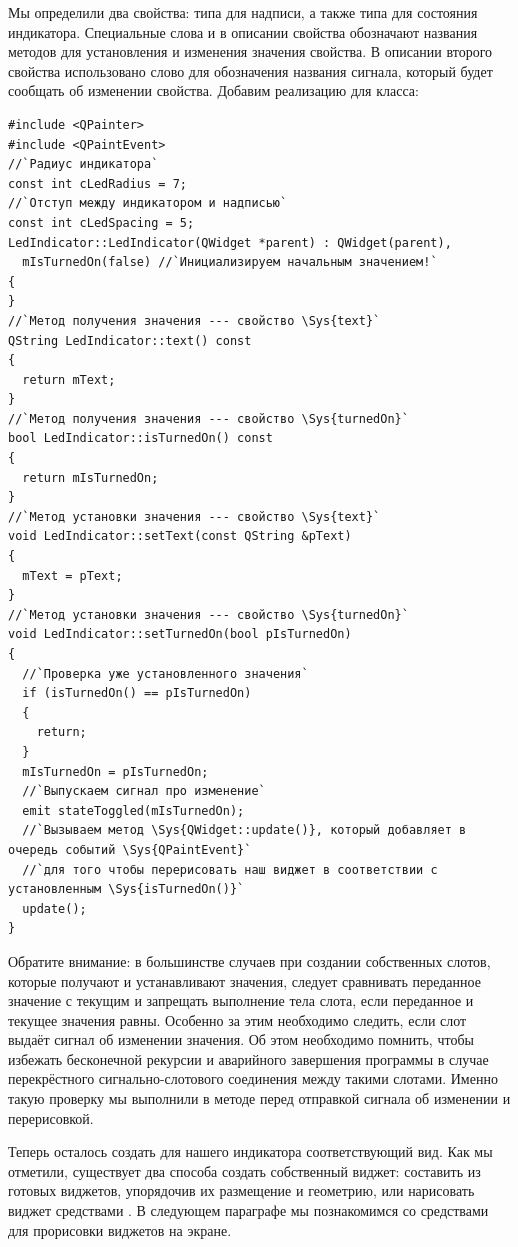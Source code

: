 Мы определили два свойства:  типа  для надписи, а также
 типа  для состояния индикатора. Специальные слова  и
 в описании свойства обозначают названия методов для установления и изменения значения свойства. В
описании второго свойства использовано слово  для обозначения названия сигнала, который будет
сообщать об изменении свойства. Добавим реализацию для класса:
\begin{lstlisting}
#include <QPainter>
#include <QPaintEvent>
//`Радиус индикатора`
const int cLedRadius = 7;
//`Отступ между индикатором и надписью`
const int cLedSpacing = 5;
LedIndicator::LedIndicator(QWidget *parent) : QWidget(parent),
  mIsTurnedOn(false) //`Инициализируем начальным значением!`
{
}
//`Метод получения значения --- свойство \Sys{text}`
QString LedIndicator::text() const
{
  return mText;
}
//`Метод получения значения --- свойство \Sys{turnedOn}`
bool LedIndicator::isTurnedOn() const
{
  return mIsTurnedOn;
}
//`Метод установки значения --- свойство \Sys{text}`
void LedIndicator::setText(const QString &pText)
{
  mText = pText;
}
//`Метод установки значения --- свойство \Sys{turnedOn}`
void LedIndicator::setTurnedOn(bool pIsTurnedOn)
{
  //`Проверка уже установленного значения`
  if (isTurnedOn() == pIsTurnedOn)
  {
    return;
  }
  mIsTurnedOn = pIsTurnedOn;
  //`Выпускаем сигнал про изменение`
  emit stateToggled(mIsTurnedOn);
  //`Вызываем метод \Sys{QWidget::update()}, который добавляет в очередь событий \Sys{QPaintEvent}`
  //`для того чтобы перерисовать наш виджет в соответствии с установленным \Sys{isTurnedOn()}`
  update();
}
\end{lstlisting}


Обратите внимание: в большинстве случаев при создании собственных слотов, которые получают и
устанавливают значения, следует сравнивать переданное значение с текущим и запрещать выполнение тела слота, если
переданное и текущее значения равны. Особенно за этим необходимо следить, если слот выдаёт сигнал об изменении
значения. Об этом необходимо помнить, чтобы избежать бесконечной рекурсии и аварийного завершения программы в случае
перекрёстного сигнально-слотового соединения между такими слотами. Именно такую проверку мы выполнили в методе
 перед отправкой сигнала об изменении и перерисовкой.

Теперь осталось создать для нашего индикатора соответствующий вид. Как мы отметили, существует два способа создать
собственный виджет: составить из готовых виджетов, упорядочив их размещение и геометрию, или нарисовать виджет
средствами . В следующем параграфе мы познакомимся со средствами для прорисовки виджетов на экране.

